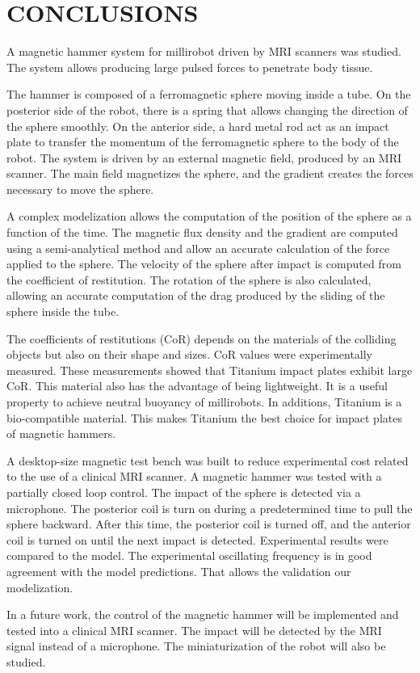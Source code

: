 \documentclass[letterpaper, 10 pt, conference]{ieeeconf}  %
\begin{document}
\section{CONCLUSIONS}

A magnetic hammer system for millirobot driven by MRI scanners was studied. The system allows producing large pulsed forces to penetrate body tissue.\par
The hammer is composed of a ferromagnetic sphere moving inside a tube. On the posterior side of the robot, there is a spring that allows changing the direction of the sphere smoothly. On the anterior side, a hard metal rod act as an impact plate to transfer the momentum of the ferromagnetic sphere to the body of the robot.
The system is driven by an external magnetic field, produced by an MRI scanner. The main field magnetizes the sphere, and the gradient creates the forces necessary to move the sphere.\par
 A complex modelization allows the computation of the position of the sphere as a function of the time. The magnetic flux density and the gradient are computed using a semi-analytical method and allow an accurate calculation of the force applied to the sphere. The velocity of the sphere after impact is computed from the coefficient of restitution. The rotation of the sphere is also calculated, allowing an accurate computation of the drag produced by the sliding of the sphere inside the tube.\par
The coefficients of restitutions (CoR) depends on the materials of the colliding objects but also on their shape and sizes. CoR values were experimentally measured. These measurements showed that Titanium impact plates exhibit large CoR. This material also has the advantage of being lightweight. It is a useful property to achieve neutral buoyancy of millirobots. In additions, Titanium is a bio-compatible material. This makes Titanium the best choice for impact plates of magnetic hammers.\par
A desktop-size magnetic test bench was built to reduce experimental cost related to the use of a clinical MRI scanner. A magnetic hammer was tested with a partially closed loop control. The impact of the sphere is detected via a microphone. The posterior coil is turn on during a predetermined time to pull the sphere backward. After this time, the posterior coil is turned off, and the anterior coil is turned on until the next impact is detected. Experimental results were compared to the model. The experimental oscillating frequency is in good agreement with the model predictions. That allows the validation our modelization.\par
In a future work, the control of the magnetic hammer will be implemented and tested into a clinical MRI scanner. The impact will be detected by the MRI signal instead of a microphone. The miniaturization of the robot will also be studied.
\end{document}
